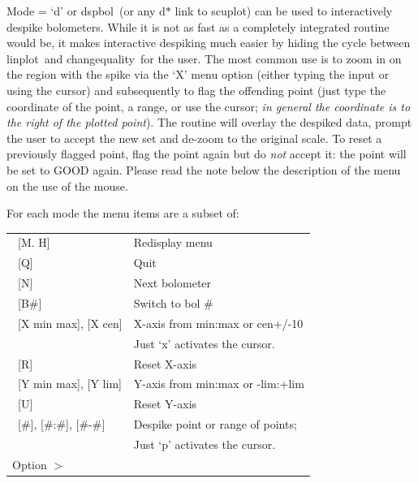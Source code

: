 \documentclass[twoside,11pt]{article}
\newcommand{\task}[1]{{\sf #1}}
\newcommand{\chgqual}{\htmlref{\task{change\_quality}}{CHANGE_QUALITY}}
\newcommand{\dspbol}{\htmlref{\task{dspbol}}{DSPBOL}}
\newcommand{\linplot}{\xref{\task{linplot}}{sun95}{LINPLOT}}
\newcommand{\htmlref}[2]{#1}
\newcommand{\xref}[3]{#1}
\renewcommand{\_}{\texttt{\symbol{95}}}
\begin{document}
{{      Mode = `d' or \dspbol\ (or any d$*$ link to scuplot) can be used to
      interactively despike bolometers. While it is not as fast as a
      completely integrated routine would be, it makes interactive
      despiking much easier by hiding the cycle between \linplot\ and
      \chgqual\ for the user. The most common use is to zoom in on
      the region with the spike via the `X' menu option (either typing
      the input or using the cursor) and subsequently to flag the
      offending point (just type the coordinate of the point, a range, or
      use the cursor; \textit{in general the coordinate is to the right of the
      plotted point}). The routine will overlay the despiked data, prompt
      the user to accept the new set and de-zoom to the original
      scale. To reset a previously flagged point, flag the point again
      but do \textit{not} accept it: the point will be set to GOOD again.  
      Please read the note below the description of the menu on the use of the
      mouse.

      For each mode the menu items are a subset of:

\begin{center}
\begin{tabular}{ll}     
\        [M. H]                & Redisplay menu\\   
\        [Q]                   &Quit\\
\        [N]                   &Next bolometer\\
\        [B\#]                  &Switch to bol \#\\
\        [X min max], [X cen]  &X-axis from min:max or cen+/-10\\
\                              &Just `x' activates the cursor.\\
\        [R]                   &Reset X-axis\\
\        [Y min max], [Y lim]  &Y-axis from min:max or -lim:+lim\\
\        [U]                   &Reset Y-axis\\
\        [\#], [\#:\#], [\#-\#]     &Despike point or range of points;\\
                              &Just `p' activates the cursor.\\

        Option $>$ & \\
\end{tabular}
\end{center}

}}
\end{document}
